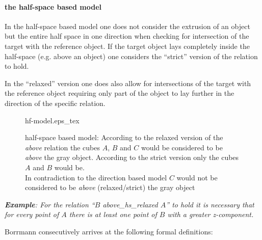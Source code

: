 \documentclass[paper=a4, fontsize=11pt]{scrartcl} %
\numberwithin{equation}{section} %
\numberwithin{figure}{section} %
\numberwithin{table}{section} %
\begin{document}
\paragraph{the half-space based model}\label{sec:half-space-based-model}
In the half-space based model one does not consider the extrusion of an object but the entire half space in one direction when checking for intersection of the target with the reference object. If the target object lays completely inside the half-space (e.g. above an object) one considers the ``strict''  version of the relation to hold. 

In the ``relaxed'' version one does also allow for intersections of the target with the reference object requiring only part of the object to lay further in the direction of the specific relation. 

\begin{figure}
  \centering
  \def\svgwidth{20em}
  {hf-model.eps_tex}
  \caption{half-space based model: According to the relaxed version of the \emph{above} relation the cubes $A$, $B$ and $C$ would be considered to be \emph{above} the gray object. According to the strict version only the cubes $A$ and $B$ would be. \\ In contradiction to the direction based model $C$ would not be considered to be \emph{above} (relaxed/strict) the gray object }
  \label{fig:direction-model}
\end{figure}

\textit{\textbf{Example}: For the relation ``$B$ above\_hs\_relaxed $A$'' to hold it is necessary that for every point of $A$ there is at least one point of $B$ with a greater z-component. 
}

Borrmann consecutively arrives at the following formal definitions:
\end{document}
